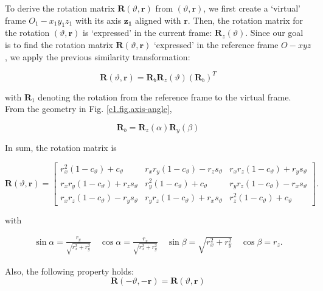 \documentclass[10pt]{article}
\begin{document}
To derive the rotation matrix $\boldsymbol{R}(\vartheta, \boldsymbol{r})$ from $(\vartheta, \boldsymbol{r})$, we first create a `virtual' frame $O_1- x_1 y_1 z_1$ with its axis $\boldsymbol{z_1}$ aligned with $\boldsymbol{r}$. Then, the rotation matrix for the rotation $(\vartheta, \boldsymbol{r})$  is `expressed' in the current frame: $\boldsymbol{R}_{z}(\vartheta)$. Since our goal is to find the rotation matrix $\boldsymbol{R}(\vartheta, \boldsymbol{r})$  `expressed' in the reference frame $O- x y z$, we apply the previous similarity transformation: 

    $$
     \boldsymbol{R}(\vartheta, \boldsymbol{r})= \boldsymbol{R}_{b} \boldsymbol{R}_{z}(\vartheta) (\boldsymbol{R}_{b})^T
    $$

with $\boldsymbol{R}_{1}$ denoting the rotation from the reference frame to the virtual frame. From the geometry in Fig. \ref{c1.fig.axis-angle}, 

$$
\boldsymbol{R}_{b}=\boldsymbol{R}_{z}(\alpha) \boldsymbol{R}_{y}(\beta) 
$$


In sum, the rotation matrix is

$$
\boldsymbol{R}(\vartheta, \boldsymbol{r})=\left[\begin{array}{ccc}
r_{x}^{2}\left(1-c_{\vartheta}\right)+c_{\vartheta} & r_{x} r_{y}\left(1-c_{\vartheta}\right)-r_{z} s_{\vartheta} & r_{x} r_{z}\left(1-c_{\vartheta}\right)+r_{y} s_{\vartheta} \\
r_{x} r_{y}\left(1-c_{\vartheta}\right)+r_{z} s_{\vartheta} & r_{y}^{2}\left(1-c_{\vartheta}\right)+c_{\vartheta} & r_{y} r_{z}\left(1-c_{\vartheta}\right)-r_{x} s_{\vartheta} \\
r_{x} r_{z}\left(1-c_{\vartheta}\right)-r_{y} s_{\vartheta} & r_{y} r_{z}\left(1-c_{\vartheta}\right)+r_{x} s_{\vartheta} & r_{z}^{2}\left(1-c_{\vartheta}\right)+c_{\vartheta}
\end{array}\right] .
$$

with 

 

$$
\begin{gathered}
\sin \alpha=\frac{r_{y}}{\sqrt{r_{x}^{2}+r_{y}^{2}}} \quad \cos \alpha=\frac{r_{x}}{\sqrt{r_{x}^{2}+r_{y}^{2}}} \quad
\sin \beta=\sqrt{r_{x}^{2}+r_{y}^{2}} \quad \cos \beta=r_{z} .
\end{gathered}
$$



Also, the following property holds:
$$
\boldsymbol{R}(-\vartheta,-\boldsymbol{r})=\boldsymbol{R}(\vartheta, \boldsymbol{r})
$$
\end{document}
